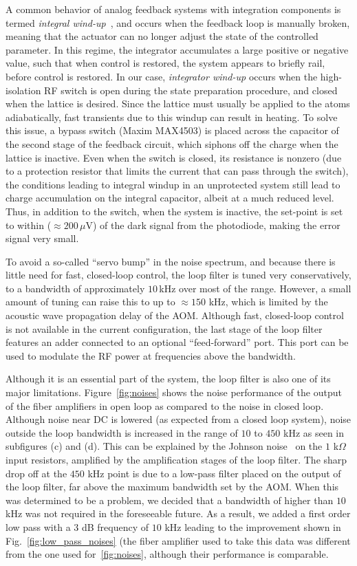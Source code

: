 \documentclass[twocolumn,aps,pra,showpacs,preprintnumbers,bibnotes]{revtex4-1}
\begin{document}
A common behavior of analog feedback systems with integration components is termed \textit{integral wind-up}~\cite{Bechhoefer2005}, and occurs when the feedback loop is manually broken, meaning that the actuator can no longer adjust the state of the controlled parameter.
In this regime, the integrator accumulates a large positive or negative value, such that when control is restored, the system appears to briefly rail, before control is restored.
In our case, \textit{integrator wind-up} occurs when the high-isolation RF switch is open during the state preparation procedure, and closed when the lattice is desired.
Since the lattice must usually be applied to the atoms adiabatically, fast transients due to this windup can result in heating.
To solve this issue, a bypass switch (Maxim MAX4503) is placed across the capacitor of the second stage of the feedback circuit, which siphons off the charge when the lattice is inactive.
Even when the switch is closed, its resistance is nonzero (due to a protection resistor that limits the current that can pass through the switch), the conditions leading to integral windup in an unprotected system still lead to charge accumulation on the integral capacitor, albeit at a much reduced level.
Thus, in addition to the switch, when the system is inactive, the set-point is set to within ($\approx 200\,\mu$V) of the dark signal from the photodiode, making the error signal very small.

To avoid a so-called ``servo bump'' in the noise spectrum, and because there is little need for fast, closed-loop control, the loop filter is tuned very conservatively, to a bandwidth of approximately $10\,$kHz over most of the range.
However, a small amount of tuning can raise this to up to $\approx150$ kHz, which is limited by the acoustic wave propagation delay of the AOM.
Although fast, closed-loop control is not available in the current configuration, the last stage of the loop filter features an adder connected to an optional ``feed-forward'' port.
This port can be used to modulate the RF power at frequencies above the bandwidth.

Although it is an essential part of the system, the loop filter is also one of its major limitations. Figure~\ref{fig:noises} shows the noise performance of the output of the fiber amplifiers in open loop as compared to the noise in closed loop. Although noise near DC is lowered (as expected from a closed loop system), noise outside the loop bandwidth is increased in the range of $10$ to $450$ kHz as seen in subfigures (c) and (d).
This can be explained by the Johnson noise~\cite{Horowitz2015} on the $1$ k$\Omega$ input resistors, amplified by the amplification stages of the loop filter.
The sharp drop off at the $450$ kHz point is due to a low-pass filter placed on the output of the loop filter, far above the maximum bandwidth set by the AOM.
When this was determined to be a problem, we decided that a bandwidth of higher than $10\,$ kHz was not required in the foreseeable future.
As a result, we added a first order low pass with a $3$ dB frequency of $10$ kHz leading to the improvement shown in Fig.~\ref{fig:low_pass_noises} (the fiber amplifier used to take this data was different from the one used for~\ref{fig:noises}, although their performance is comparable.
\end{document}
